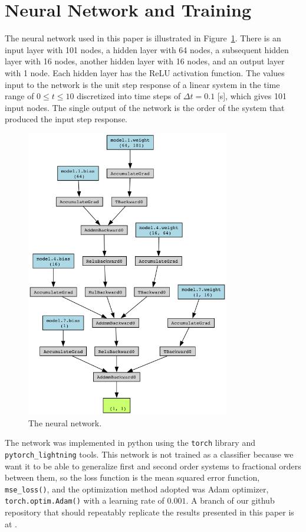 \section{Neural Network and Training}

  The neural network used in this paper is illustrated in
  Figure~\ref{fig:thennet}. There is an input layer with 101 nodes, a hidden
  layer with 64 nodes, a subsequent hidden layer with 16 nodes, another hidden
  layer with 16 nodes, and an output layer with 1 node. Each hidden layer has
  the ReLU activation function. The values input to the network is the unit step
  response of a linear system in the time range of $0 \leq t \leq 10$
  discretized into time steps of $\Delta t = 0.1$ [s], which gives 101 input
  nodes. The single output of the network is the order of the system that
  produced the input step response. 

  \begin{figure}
  \centering
  \includegraphics[width=3.5in]{viz.png}
  \caption{The neural network.}
  \label{fig:thennet}
  \end{figure}

  The network was implemented in python using the \texttt{torch} library and
  \texttt{pytorch\_lightning} tools. This network is not trained as a classifier
  because we want it to be able to generalize first and second order systems to
  fractional orders between them, so the loss function is the mean squared error
  function, \texttt{mse\_loss()}, and the optimization method adopted was Adam
  optimizer, \texttt{torch.optim.Adam()} with a learning rate of $0.001$. A
  branch of our github repository that should repeatably replicate the results
  presented in this paper is at \cite{Goodwine_Integer_trained_neural}.

